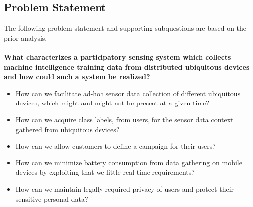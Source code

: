 \subsection{Problem Statement}
\label{sub:problem_statement}


The following problem statement and supporting subquestions are based on the prior analysis.
\\\\
\textbf{What characterizes a participatory sensing system which collects machine intelligence training data from distributed ubiquitous devices and how could such a system be realized?}

\begin{itemize}
    \item How can we facilitate ad-hoc sensor data collection of different ubiquitous devices, which might and might not be present at a given time?
    \item How can we acquire class labels, from users, for the sensor data context gathered from ubiquitous devices?  
    \item How can we allow customers to define a campaign for their users?
    \item How can we minimize battery consumption from data gathering on mobile devices by exploiting that we little real time requirements?
    \item How can we maintain legally required privacy of users and protect their sensitive personal data? 
\end{itemize}

